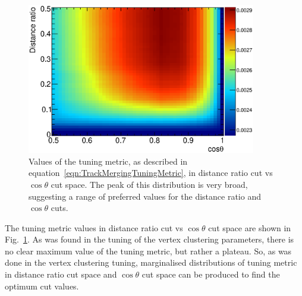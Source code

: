 \begin{figure}[!b]
  \centering
  \includegraphics[width=10cm]{images/selection/vertex_recon/TrackMergingTuningFOM}
  \caption{Values of the tuning metric, as described in equation~\ref{eqn:TrackMergingTuningMetric}, in distance ratio cut vs $\cos\theta$ cut space.  The peak of this distribution is very broad, suggesting a range of preferred values for the distance ratio and $\cos\theta$ cuts.}
  \label{fig:TrackMergingTuningFOM}
\end{figure}
The tuning metric values in distance ratio cut vs $\cos\theta$ cut space are shown in Fig.~\ref{fig:TrackMergingTuningFOM}.  As was found in the tuning of the vertex clustering parameters, there is no clear maximum value of the tuning metric, but rather a plateau.  So, as was done in the vertex clustering tuning, marginalised distributions of tuning metric in distance ratio cut space and $\cos\theta$ cut space can be produced to find the optimum cut values. 
